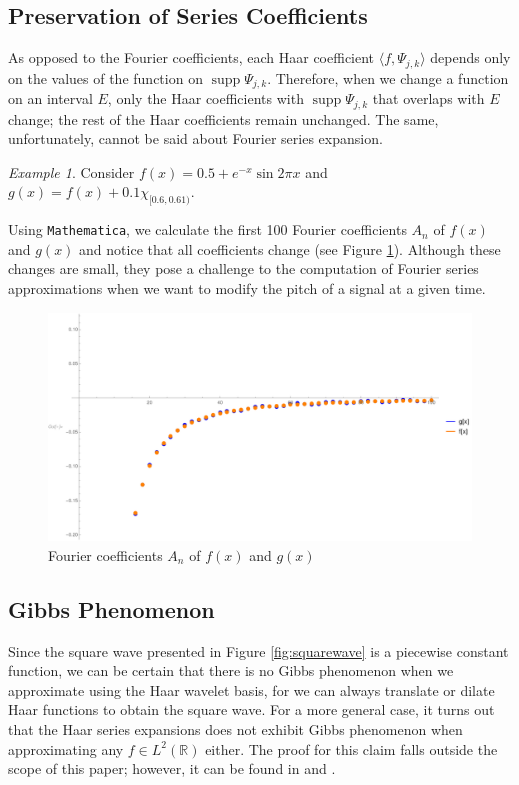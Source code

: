 \documentclass[11pt]{amsart}
\theoremstyle{theorem} %
\theoremstyle{definition}
\theoremstyle{example}
\theoremstyle{remark}
\newtheorem{exmp}[thm]{Example}
\numberwithin{equation}{section}
\newcommand{\R}{\mathbb{R}}
\DeclareMathOperator*{\supp}{supp}
\begin{document}
\subsection{Preservation of Series Coefficients} As opposed to the Fourier coefficients, each Haar coefficient $ \langle f,\varPsi_{j,k} \rangle $ depends only on the values of the function on $ \supp \varPsi_{j,k} $. Therefore, when we change a function on an interval $ E $, only the Haar coefficients with $ \supp \varPsi_{j,k} $ that overlaps with $ E $ change; the rest of the Haar coefficients remain unchanged. The same, unfortunately, cannot be said about Fourier series expansion.

\begin{exmp}
	Consider $ f(x) = 0.5 + e^{-x} \sin{2\pi x} $ and $ g(x) = f(x) + 0.1 \chi_{[0.6,0.61)} $.
\end{exmp}

Using \verb|Mathematica|, we calculate the first 100 Fourier coefficients $ A_n $ of $ f(x) $ and $ g(x) $ and notice that all coefficients change (see Figure \ref{fig:fouriercoeff}). Although these changes are small, they pose a challenge to the computation of Fourier series approximations when we want to modify the pitch of a signal at a given time.

\begin{figure}[h]
	\centering
	\includegraphics[width=0.5\linewidth]{img/fourier_coeff}
	\caption{Fourier coefficients $ A_n $ of $ f(x) $ and $ g(x) $}
	\label{fig:fouriercoeff}
\end{figure}

\subsection{Gibbs Phenomenon}
Since the square wave presented in Figure \ref{fig:squarewave} is a piecewise constant function, we can be certain that there is no Gibbs phenomenon when we approximate using the Haar wavelet basis, for we can always translate or dilate Haar functions to obtain the square wave. For a more general case, it turns out that the Haar series expansions does not exhibit Gibbs phenomenon when approximating any $ f \in L^2(\R) $ either. The proof for this claim falls outside the scope of this paper; however, it can be found in \cite[Chap. 5]{raeen} and \cite{kelly}.

\printbibliography
\end{document}
